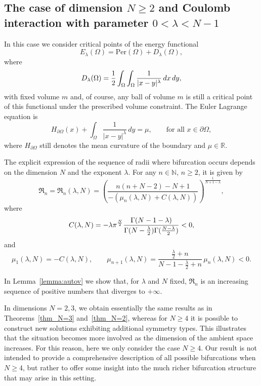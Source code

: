 \documentclass[10pt,reqno,english]{amsart}
\newcommand{\rn}{{\mathfrak R}_n  }
\newcommand{\N}{\mathbb{N}}
\newcommand{\R} {\mathbb R}
\theoremstyle{definition}
\numberwithin{equation}{section}
\begin{document}
\medskip


\subsection{The case of dimension \texorpdfstring{$N\geq2$}{N>=2} and Coulomb interaction with parameter \texorpdfstring{$0<\lambda <N-1$}{0<lambda<N-1}}

In this case we consider critical points of the energy functional
\[
E_\lambda ( \Omega) = {\mbox {Per}} (\Omega) +D_\lambda (\Omega),
\]
where 
\[
D_\lambda (\Omega)={1\over 2} \int_{\Omega} \int_{\Omega} {1\over |x-y|^{\lambda} } \, dx \, dy,
\]
with fixed volume $m$ and, of course, any ball of volume $m$ is still a critical point of this functional under the prescribed volume constraint. The Euler Lagrange equation is
\begin{equation}\label{eq:la}
H_{\partial\Omega}(x)+\int_\Omega \frac{1}{|x-y|^\lambda }\,dy=\mu,
\qquad \text{for all } x\in\partial\Omega,
\end{equation}
where $H_{\partial\Omega}$ still denotes the mean curvature of the boundary and $\mu\in\R$.

The explicit expression of the sequence of radii where bifurcation occurs depends on the dimension $N$ and the exponent $\lambda$. For any $n \in \N$, $n\ge2$, it is given by 
\begin{equation}\label{Rnla}
\mathfrak R_n= \rn (\lambda , N) =\left(\frac{n(n+N-2)-N+1}{-(\mu_n (\lambda , N)+C({\lambda},N))}\right)^{\frac{1}{N+1-\lambda}},
\end{equation}
where
\[
C (\lambda , N) = -\lambda\pi^{\frac N2}\frac{\Gamma(N-1-\lambda)}{ \Gamma (N -{\lambda \over 2})\Gamma(\frac{N-\lambda}{2})}<0,
\]
and
\[
\mu_1(\lambda , N)=-C(\lambda , N),\qquad\mu_{n+1}(\lambda , N)=\frac{\frac\lambda2+n}{N-1-\frac\lambda2+n}\,\mu_n(\lambda , N)<0.
\]

In Lemma~\ref{lemma:autov} we show that, for $\lambda$ and $N$ fixed, $\rn$ is an increasing sequence of positive numbers that diverges to $+\infty$.
 
\medskip

In dimensions $N=2,3$, we obtain essentially the same results as in Theorems~\ref{thm_N=3} and~\ref{thm_N=2}, whereas for $N \ge 4$ it is possible to construct new solutions exhibiting additional symmetry types. This illustrates that the situation becomes more involved as the dimension of the ambient space increases. For this reason, here we only consider the case $N\ge4$.
 Our result is not intended to provide a comprehensive description of all possible bifurcations when $N \ge 4$, but rather to offer some insight into the much richer bifurcation structure that may arise in this setting.
\end{document}
